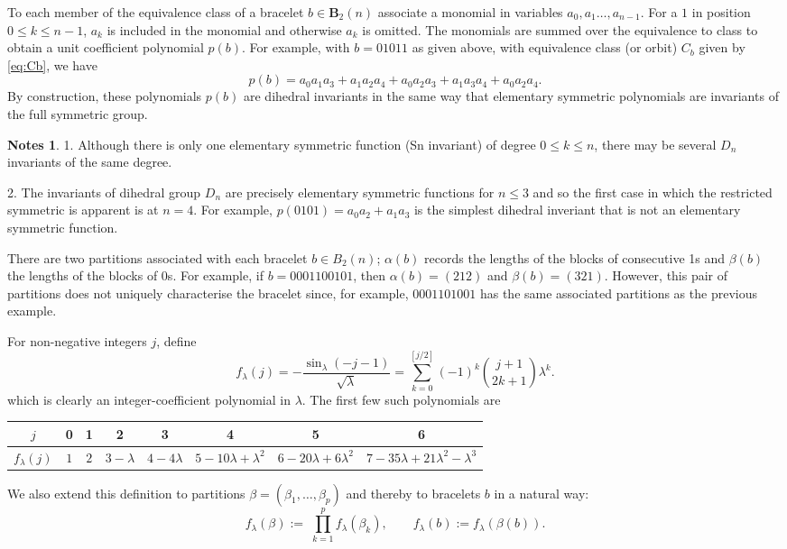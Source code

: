 \documentclass[11pt]{article}
\theoremstyle{definition}
\newtheorem*{notes}{Notes}
\begin{document}
To each member of the equivalence class of a bracelet $b\in\mathbf B_2(n)$ associate a monomial in variables $a_0,a_1\dots,a_{n-1}$. For a $1$ in position $0\le k\le n-1$, $a_k$ is included in the monomial and otherwise $a_k$ is omitted. The monomials are summed over the equivalence to class to obtain a unit coefficient polynomial $p(b)$. For example, with $b=01011$ as given above, with equivalence class (or orbit) $C_b$ given by \eqref{eq:Cb}, we have
\begin{equation}
 	p(b)=a_0a_1a_3+a_1a_2a_4+a_0a_2a_3+a_1a_3a_4+a_0a_2a_4.
 \end{equation} 
By construction, these polynomials $p(b)$ are dihedral invariants in the same way that elementary symmetric polynomials are invariants of the full symmetric group.
\begin{notes}		
1. Although there is only one elementary symmetric function (Sn invariant) of degree $0 \le k \le n$, there may be several
$D_n$ invariants of the same degree.

2. The invariants of dihedral group $D_n$ are precisely elementary symmetric functions for $n \le 3$ and so the first case in which the restricted symmetric is apparent is at $n = 4$. For example, $p(0101) = a_0a_2 + a_1a_3$ is the simplest dihedral inveriant that is not an elementary symmetric function.	
\end{notes}		
There are two partitions associated with each bracelet $b \in B_2(n)$; $\alpha(b)$ records the lengths of the blocks of 
consecutive 1s and $\beta(b)$ the lengths of the blocks of 0s. For example, if $b = 0001100101$, then $\alpha(b) = (212)$ 
and $\beta(b) = (321)$. However, this pair of partitions does not uniquely characterise the bracelet since, for example, $0001101001$ has the same associated partitions as the previous example.

For non-negative integers $j$, define
\begin{equation}
f_\lambda(j)=-\frac{\sin_\lambda(-j-1)}{\sqrt\lambda}=\sum_{k=0}^{[j/2]}(-1)^k\binom{j+1}{2k+1}\lambda^k.
\end{equation}
which is clearly an integer-coefficient polynomial in $\lambda$. The first few such polynomials are
\begin{center}
\begin{tabular}{c|ccccccc}
$j$&0&1&2&3&4&5&6\\\hline
$f_\lambda(j)$& $1$&$2$&$3-\lambda$&$4-4\lambda$&$5-10\lambda+\lambda^2$&$6-20\lambda+6\lambda^2$&$7-35\lambda+21\lambda^2-\lambda^3$	
\end{tabular}
\end{center}
We also extend this definition to partitions $\beta = (\beta_1, \dots, \beta_p)$ and thereby to bracelets $b$ in a natural way:
\begin{equation}
f_\lambda(\beta) := 􏰅\prod_{k=1}^p f_\lambda(\beta_k),\qquad f_\lambda(b):=f_\lambda(\beta(b)).
\end{equation}
\end{document}
